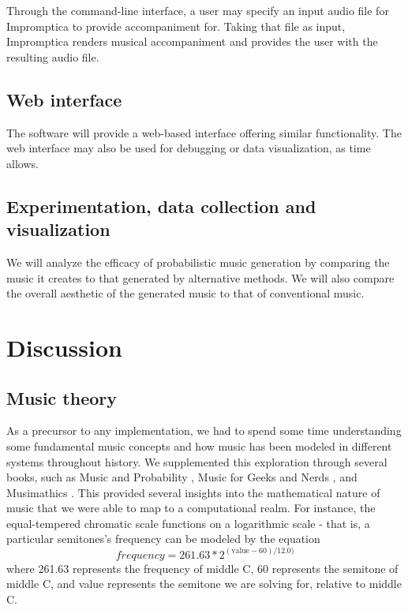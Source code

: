 \documentclass[11pt,conference,letterpaper]{IEEEtran}
\begin{document}
Through the command-line interface, a user may specify an input audio file for Impromptica to provide accompaniment for. Taking that file as input, Impromptica renders musical accompaniment and provides the user with the resulting audio file.

\subsection{Web interface}

The software will provide a web-based interface offering similar functionality. The web interface may also be used for debugging or data visualization, as time allows.

\subsection{Experimentation, data collection and visualization}

We will analyze the efficacy of probabilistic music generation by comparing the music it creates to that generated by alternative methods.  We will also compare the overall aesthetic of the generated music to that of conventional music.

\section{Discussion}

\subsection {Music theory}
As a precursor to any implementation, we had to spend some time understanding some fundamental music concepts and how music has been modeled in different systems throughout history. We supplemented this exploration through several books, such as Music and Probability \cite{temperly2007mprob}, Music for Geeks and Nerds \cite{krogerGeeksNerds}, and Musimathics \cite{loy2006musimathics}. This provided several insights into the mathematical nature of music that we were able to map to a computational realm. For instance, the equal-tempered chromatic scale functions on a logarithmic scale - that is, a particular semitones's frequency can be modeled by the equation
{\small
	\[frequency = 261.63 * 2^{(\text{value} - 60) / 12.0)}\]
}
where 261.63 represents the frequency of middle C, 60 represents the semitone of middle C, and value represents the semitone we are solving for, relative to middle C.
\end{document}
